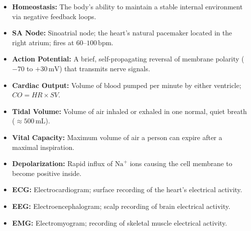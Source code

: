 \documentclass[12pt,a4paper]{article}
\begin{document}
\begin{tcolorbox}[defbox, title={\textbf{One-Line Definitions}}]
\begin{itemize}[leftmargin=*, itemsep=2.5pt, topsep=0pt]
  \item \textbf{Homeostasis:} The body's ability to maintain a stable internal environment via negative feedback loops.
  \item \textbf{SA Node:} Sinoatrial node; the heart's natural pacemaker located in the right atrium; fires at $60$--$100\,\text{bpm}$.
  \item \textbf{Action Potential:} A brief, self-propagating reversal of membrane polarity ($-70$ to $+30\,\text{mV}$) that transmits nerve signals.
  \item \textbf{Cardiac Output:} Volume of blood pumped per minute by either ventricle; $CO = HR \times SV$.
  \item \textbf{Tidal Volume:} Volume of air inhaled or exhaled in one normal, quiet breath ($\approx 500\,\text{mL}$).
  \item \textbf{Vital Capacity:} Maximum volume of air a person can expire after a maximal inspiration.
  \item \textbf{Depolarization:} Rapid influx of $\text{Na}^+$ ions causing the cell membrane to become positive inside.
  \item \textbf{ECG:} Electrocardiogram; surface recording of the heart's electrical activity.
  \item \textbf{EEG:} Electroencephalogram; scalp recording of brain electrical activity.
  \item \textbf{EMG:} Electromyogram; recording of skeletal muscle electrical activity.
\end{itemize}
\end{tcolorbox}
\end{document}
